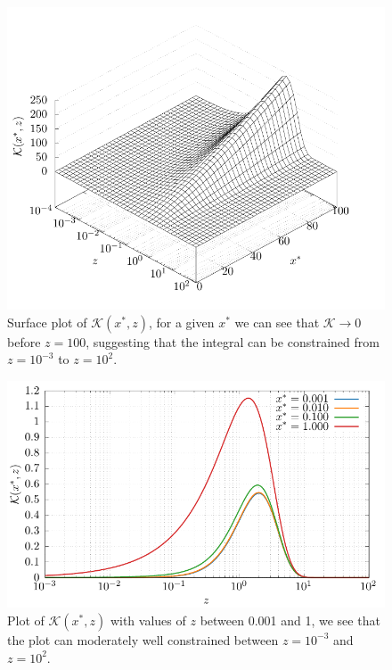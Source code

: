 \begin{figure}[ht]
  \centering
  \includegraphics{assets/integral/func_xe_3d.pdf}
  \caption[3D plot of $\mathcal{K}(x^*,z)$]{Surface plot of $\mathcal{K}(x^*,z)$, for a given $x^*$ we can see that $\mathcal{K} \rightarrow 0$ before $z = 100$, suggesting that the integral can be constrained from $z=10^{-3}$ to $z=10^2$.}
  \label{fig:constrainplot3d}
\end{figure}

\begin{figure}[ht]
  \centering
  \includegraphics{assets/integral/func_xe_plot.pdf}
  \caption[Plot of $\mathcal{K}(x^*,z)$ for discrete values of $z$]{Plot of $\mathcal{K}(x^*,z)$ with values of $z$ between 0.001 and 1, we see that the plot can moderately well constrained between $z=10^{-3}$ and $z=10^2$.}
  \label{fig:constrainplot2d}
\end{figure}

